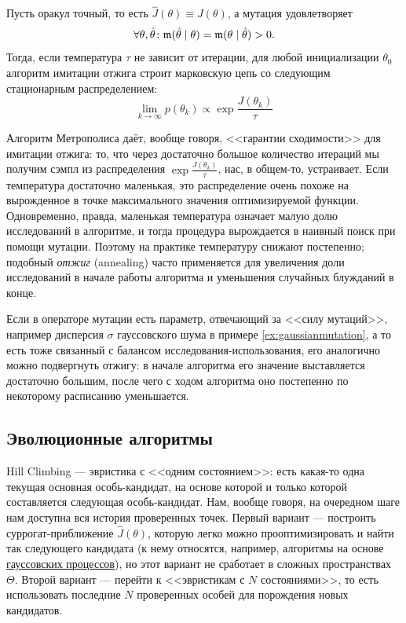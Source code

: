 \begin{proposition}
Пусть оракул точный, то есть $\hat{J}(\theta) \equiv J(\theta)$, а мутация удовлетворяет
$$\forall \theta, \hat{\theta} \colon \mut(\hat{\theta} \HM\mid \theta) = \mut(\theta \HM\mid \hat{\theta}) > 0.$$
Тогда, если температура $\tau$ не зависит от итерации, для любой инициализации $\theta_0$ алгоритм имитации отжига строит марковскую цепь со следующим стационарным распределением:
$$\lim_{k \to \infty} p(\theta_k) \propto \exp \frac{J(\theta_k)}{\tau}$$
\end{proposition}

Алгоритм Метрополиса даёт, вообще говоря, <<гарантии сходимости>> для имитации отжига: то, что через достаточно большое количество итераций мы получим сэмпл из распределения $\exp \frac{J(\theta_k)}{\tau}$, нас, в общем-то, устраивает. Если температура достаточно маленькая, это распределение очень похоже на вырожденное в точке максимального значения оптимизируемой функции. Одновременно, правда, маленькая температура означает малую долю исследований в алгоритме, и тогда процедура вырождается в наивный поиск при помощи мутации. Поэтому на практике температуру снижают постепенно; подобный \emph{отжиг} (annealing) часто применяется для увеличения доли исследований в начале работы алгоритма и уменьшения случайных блужданий в конце.

\begin{example}
\begin{center}
\end{center}
\end{example}

\begin{remark}
Если в операторе мутации есть параметр, отвечающий за <<силу мутаций>>, например дисперсия $\sigma$ гауссовского шума в примере \ref{ex:gaussianmutation}, а то есть тоже связанный с балансом исследования-использования, его аналогично можно подвергнуть отжигу: в начале алгоритма его значение выставляется достаточно большим, после чего с ходом алгоритма оно постепенно по некоторому расписанию уменьшается.
\end{remark}

\subsection{Эволюционные алгоритмы}

Hill Climbing --- эвристика с <<одним состоянием>>: есть какая-то одна текущая основная особь-кандидат, на основе которой и только которой составляется следующая особь-кандидат. Нам, вообще говоря, на очередном шаге нам доступна вся история проверенных точек. Первый вариант --- построить суррогат-приближение $\hat{J}(\theta)$, которую легко можно прооптимизировать и найти так следующего кандидата (к нему относятся, например, алгоритмы на основе \href{https://distill.pub/2020/bayesian-optimization/}{гауссовских процессов}), но этот вариант не сработает в сложных пространствах $\Theta$. Второй вариант --- перейти к <<эвристикам с $N$ состояниями>>, то есть использовать последние $N$ проверенных особей для порождения новых кандидатов.

